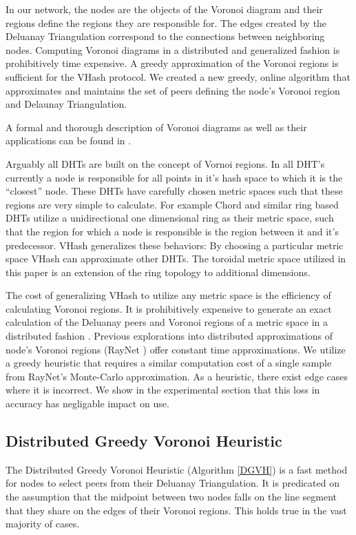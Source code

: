 \documentclass{IEEEtran}
\begin{document}
In our network, the nodes are the objects of the Voronoi diagram and their regions define the regions they are responsible for.  The edges created by the Deluanay Triangulation correspond to the connections between neighboring nodes.  Computing Voronoi diagrams in a distributed and generalized fashion is prohibitively time expensive.
A greedy approximation of the Voronoi regions is sufficient for the VHash protocol.
We created a new greedy, online algorithm that approximates and maintains the set of peers defining the node's Voronoi region and Delaunay Triangulation.




A formal and thorough description of Voronoi diagrams as well as their applications can be found in \cite{aurenhammer1991voronoi}.

Arguably all DHTs are built on the concept of Vornoi regions.
In all DHT's currently a node is responsible for all points in it's hash space to which it is the ``closest'' node.
These DHTs have carefully chosen metric spaces such that these regions are very simple to calculate.
For example Chord and similar ring based DHTs utilize a unidirectional one dimensional ring as their metric space, such that the region for which a node is responsible is the region between it and it's predecessor.
VHash generalizes these behaviors:
By choosing a particular metric space VHash can approximate other DHTs.
The toroidal metric space utilized in this paper is an extension of the ring topology to additional dimensions. 

The cost of generalizing VHash to utilize any metric space is the efficiency of calculating Voronoi regions. 
It is prohibitively expensive to generate an exact calculation of the Deluanay peers and Voronoi regions of a metric space in a distributed fashion \cite{raynet}.  %
Previous explorations into distributed approximations of node's Voronoi regions (RayNet \cite{raynet}) offer constant time approximations.
We utilize a greedy heuristic that requires a similar computation cost of a single sample from RayNet's Monte-Carlo approximation.
As a heuristic, there exist edge cases where it is incorrect.
We show in the experimental section that this loss in accuracy has negligable impact on use.

\subsection{Distributed Greedy Voronoi Heuristic}
The Distributed Greedy Voronoi Heuristic (Algorithm \ref{DGVH}) is a fast method for nodes to select peers from their Deluanay Triangulation.
It is predicated on the assumption that the midpoint between two nodes falls on the line segment that they share on the edges of their Voronoi regions.
This holds true in the vast majority of cases.
\end{document}

